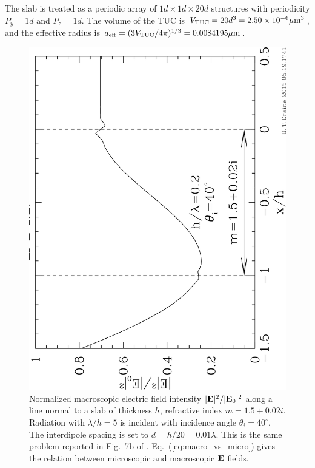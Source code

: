 The slab is treated as a periodic array of $1d\times1d\times20d$ structures
with periodicity $P_y=1d$ and $P_z=1d$.
The volume of the TUC is $V_{\rm TUC}=20d^3=2.50\times10^{-6}{\mu{\rm m}}^3$,
and the effective radius is
${a}_{\rm eff}=(3V_{\rm TUC}/4\pi)^{1/3}=0.0084195{\mu{\rm m}}$. 

\begin{figure}[h]
\begin{center}
\vspace*{-0.1cm}
%
\includegraphics[width=8.cm,angle=270]{f_rctgl_pbc_nf.png}
\vspace*{-0.4cm}
\caption{\footnotesize
         Normalized macroscopic electric field intensity 
         $|{\bf E}|^2/|{\bf E}_0|^2$ along
         a line normal to a slab of thickness $h$, 
         refractive index $m=1.5+0.02i$.
         Radiation with $\lambda/h=5$ is incident with incidence
         angle $\theta_i=40^\circ$.
         The interdipole spacing is set to $d=h/20=0.01\lambda$.
         This is the same problem reported in Fig.\ 7b of 
         \citet{Draine+Flatau_2008a}.
         Eq.\ (\ref{eq:macro_vs_micro}) gives the relation between
         microscopic and macroscopic ${\bf E}$ fields.
         }
\end{center}
\end{figure}
